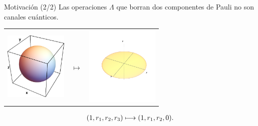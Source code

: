 \documentclass[xcolor=dvipsnames,presentation]{beamer}%
\begin{document}
\begin{frame}{Motivación (2/2)}
	\only<2>{No.}
	Las operaciones $\Lambda$ que borran dos componentes de Pauli no 
	son canales cuánticos.
	\begin{center}
	\begin{tabular}{m{2.5cm} m{1.3cm} m{2.5cm}}
		\includegraphics[width=3cm]{unit_sph}
		& \hfill \LARGE{$\longmapsto$}
		& \includegraphics[width=3.5cm]{unit_disk_xy}
	\end{tabular}
	\end{center}
	\vspace{-1cm}
	\begin{align*}
	\qty(1,r_1,r_2,r_3)\longmapsto\qty(1,r_1,r_2,0).
	\end{align*}
	
	
		
	\vspace{.5cm}
\end{frame}
\end{document}
